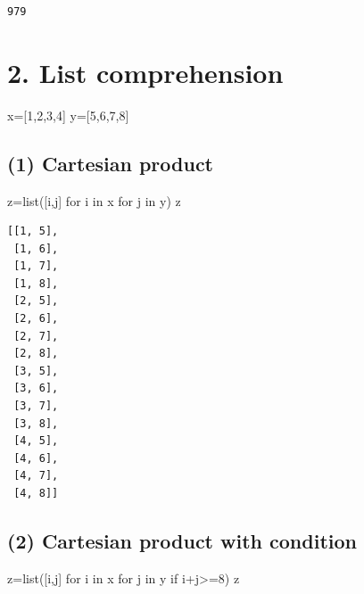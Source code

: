 \documentclass[
  a4paper,
  DIV=11,
  numbers=noendperiod]{scrreprt}
\newenvironment{Shaded}{\begin{snugshade}}{\end{snugshade}}
\newcommand{\BuiltInTok}[1]{\textcolor[rgb]{0.00,0.23,0.31}{#1}}
\newcommand{\ControlFlowTok}[1]{\textcolor[rgb]{0.00,0.23,0.31}{#1}}
\newcommand{\DecValTok}[1]{\textcolor[rgb]{0.68,0.00,0.00}{#1}}
\newcommand{\KeywordTok}[1]{\textcolor[rgb]{0.00,0.23,0.31}{#1}}
\newcommand{\NormalTok}[1]{\textcolor[rgb]{0.00,0.23,0.31}{#1}}
\newcommand{\OperatorTok}[1]{\textcolor[rgb]{0.37,0.37,0.37}{#1}}
\begin{document}
\begin{verbatim}
979
\end{verbatim}

\section*{2. List comprehension}\label{list-comprehension}


\begin{Shaded}
\begin{Highlighting}[]
\NormalTok{x}\OperatorTok{=}\NormalTok{[}\DecValTok{1}\NormalTok{,}\DecValTok{2}\NormalTok{,}\DecValTok{3}\NormalTok{,}\DecValTok{4}\NormalTok{]}
\NormalTok{y}\OperatorTok{=}\NormalTok{[}\DecValTok{5}\NormalTok{,}\DecValTok{6}\NormalTok{,}\DecValTok{7}\NormalTok{,}\DecValTok{8}\NormalTok{]}
\end{Highlighting}
\end{Shaded}

\subsection*{(1) Cartesian product}\label{cartesian-product}

\begin{Shaded}
\begin{Highlighting}[]
\NormalTok{z}\OperatorTok{=}\BuiltInTok{list}\NormalTok{([i,j] }\ControlFlowTok{for}\NormalTok{ i }\KeywordTok{in}\NormalTok{ x }\ControlFlowTok{for}\NormalTok{ j }\KeywordTok{in}\NormalTok{ y)}
\NormalTok{z}
\end{Highlighting}
\end{Shaded}

\begin{verbatim}
[[1, 5],
 [1, 6],
 [1, 7],
 [1, 8],
 [2, 5],
 [2, 6],
 [2, 7],
 [2, 8],
 [3, 5],
 [3, 6],
 [3, 7],
 [3, 8],
 [4, 5],
 [4, 6],
 [4, 7],
 [4, 8]]
\end{verbatim}

\subsection*{(2) Cartesian product with
condition}\label{cartesian-product-with-condition}

\begin{Shaded}
\begin{Highlighting}[]
\NormalTok{z}\OperatorTok{=}\BuiltInTok{list}\NormalTok{([i,j] }\ControlFlowTok{for}\NormalTok{ i }\KeywordTok{in}\NormalTok{ x }\ControlFlowTok{for}\NormalTok{ j }\KeywordTok{in}\NormalTok{ y }\ControlFlowTok{if}\NormalTok{ i}\OperatorTok{+}\NormalTok{j}\OperatorTok{\textgreater{}=}\DecValTok{8}\NormalTok{)}
\NormalTok{z}
\end{Highlighting}
\end{Shaded}
\end{document}

